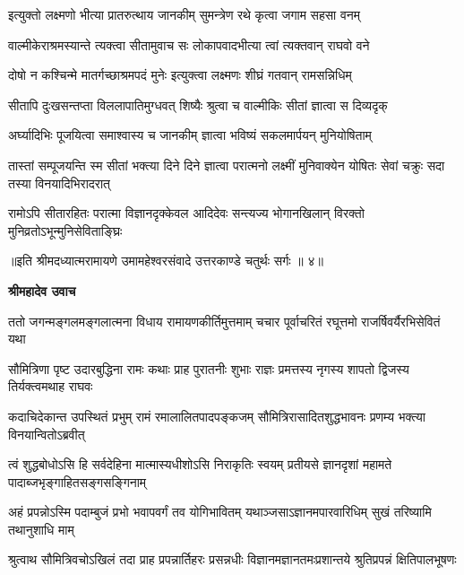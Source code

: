 \twolineshloka
{इत्युक्तो लक्ष्मणो भीत्या प्रातरुत्थाय जानकीम्}
{सुमन्त्रेण रथे कृत्वा जगाम सहसा वनम्} %

\twolineshloka
{वाल्मीकेराश्रमस्यान्ते त्यक्त्वा सीतामुवाच सः}
{लोकापवादभीत्या त्वां त्यक्तवान् राघवो वने} %

\twolineshloka
{दोषो न कश्चिन्मे मातर्गच्छाश्रमपदं मुनेः}
{इत्युक्त्वा लक्ष्मणः शीघ्रं गतवान् रामसन्निधिम्} %

\twolineshloka
{सीतापि दुःखसन्तप्ता विललापातिमुग्धवत्}
{शिष्यैः श्रुत्वा च वाल्मीकिः सीतां ज्ञात्वा स दिव्यदृक्} %

\twolineshloka
{अर्घ्यादिभिः पूजयित्वा समाश्वास्य च जानकीम्}
{ज्ञात्वा भविष्यं सकलमार्पयन् मुनियोषिताम्} %

\threelineshloka
{तास्तां सम्पूजयन्ति स्म सीतां भक्त्या दिने दिने}
{ज्ञात्वा परात्मनो लक्ष्मीं मुनिवाक्येन योषितः}
{सेवां चक्रुः सदा तस्या विनयादिभिरादरात्} %

\twolineshloka
{रामोऽपि सीतारहितः परात्मा विज्ञानदृक्केवल आदिदेवः}
{सन्त्यज्य भोगानखिलान् विरक्तो मुनिव्रतोऽभून्मुनिसेविताङ्घ्रिः} %

{॥इति श्रीमदध्यात्मरामायणे उमामहेश्वरसंवादे उत्तरकाण्डे
चतुर्थः सर्गः ॥ ४॥
}




\textbf{श्रीमहादेव उवाच}

\fourlineindentedshloka
{ततो जगन्मङ्गलमङ्गलात्मना}
{विधाय रामायणकीर्तिमुत्तमाम्}
{चचार पूर्वाचरितं रघूत्तमो}
{राजर्षिवर्यैरभिसेवितं यथा} %

\fourlineindentedshloka
{सौमित्रिणा पृष्ट उदारबुद्धिना}
{रामः कथाः प्राह पुरातनीः शुभाः}
{राज्ञः प्रमत्तस्य नृगस्य शापतो}
{द्विजस्य तिर्यक्त्वमथाह राघवः} %

\fourlineindentedshloka
{कदाचिदेकान्त उपस्थितं प्रभुम्}
{रामं रमालालितपादपङ्कजम्}
{सौमित्रिरासादितशुद्धभावनः}
{प्रणम्य भक्त्या विनयान्वितोऽब्रवीत्} %

\fourlineindentedshloka
{त्वं शुद्धबोधोऽसि हि सर्वदेहिना\-}
{मात्मास्यधीशोऽसि निराकृतिः स्वयम्}
{प्रतीयसे ज्ञानदृशां महामते}
{पादाब्जभृङ्गाहितसङ्गसङ्गिनाम्} %

\fourlineindentedshloka
{अहं प्रपन्नोऽस्मि पदाम्बुजं प्रभो}
{भवापवर्गं तव योगिभावितम्}
{यथाञ्जसाऽज्ञानमपारवारिधिम्}
{सुखं तरिष्यामि तथानुशाधि माम्} %

\fourlineindentedshloka
{श्रुत्वाथ सौमित्रिवचोऽखिलं तदा}
{प्राह प्रपन्नार्तिहरः प्रसन्नधीः}
{विज्ञानमज्ञानतमःप्रशान्तये}
{श्रुतिप्रपन्नं क्षितिपालभूषणः} %

